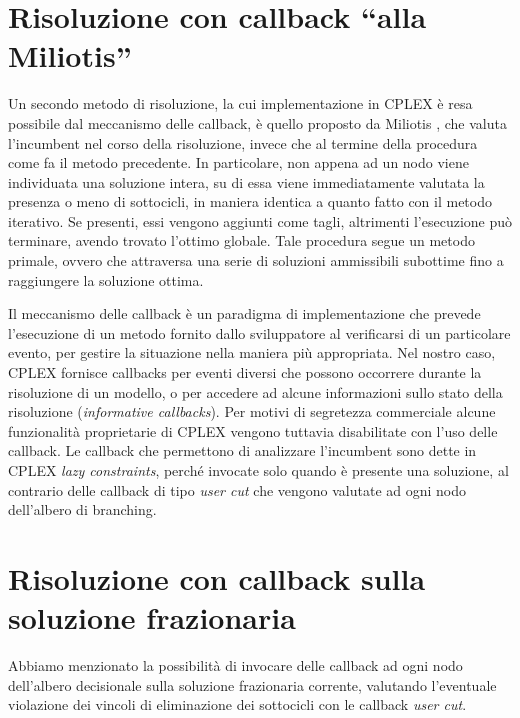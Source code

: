 \section{Risoluzione con callback ``alla Miliotis''}
Un secondo metodo di risoluzione, la cui implementazione in CPLEX è resa possibile dal meccanismo delle callback, è quello proposto da Miliotis \citep{miliotis1978using}, che valuta l'incumbent nel corso della risoluzione, invece che al termine della procedura come fa il metodo precedente. In particolare, non appena ad un nodo viene individuata una soluzione intera, su di essa viene immediatamente valutata la presenza o meno di sottocicli, in maniera identica a quanto fatto con il metodo iterativo. Se presenti, essi vengono aggiunti come tagli, altrimenti l'esecuzione può terminare, avendo trovato l'ottimo globale. Tale procedura segue un metodo primale, ovvero che attraversa una serie di soluzioni ammissibili subottime fino a raggiungere la soluzione ottima.

Il meccanismo delle callback è un paradigma di implementazione che prevede l'esecuzione di un metodo fornito dallo sviluppatore al verificarsi di un particolare evento, per gestire la situazione nella maniera più appropriata. Nel nostro caso, CPLEX fornisce callbacks per eventi diversi che possono occorrere durante la risoluzione di un modello, o per accedere ad alcune informazioni sullo stato della risoluzione (\textit{informative callbacks}). Per motivi di segretezza commerciale alcune funzionalità proprietarie di CPLEX vengono tuttavia disabilitate con l'uso delle callback. Le callback che permettono di analizzare l'incumbent sono dette in CPLEX \textit{lazy constraints}, perché invocate solo quando è presente una soluzione, al contrario delle callback di tipo \textit{user cut} che vengono valutate ad ogni nodo dell'albero di branching.

\section{Risoluzione con callback sulla soluzione frazionaria}
Abbiamo menzionato la possibilità di invocare delle callback ad ogni nodo dell'albero decisionale sulla soluzione frazionaria corrente, valutando l'eventuale violazione dei vincoli di eliminazione dei sottocicli con le callback \textit{user cut}.

